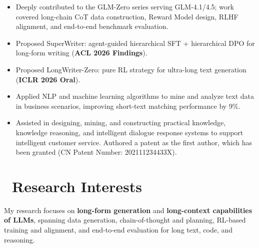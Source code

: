 \documentclass{resume}
\begin{document}
\begin{itemize}
    \item Deeply contributed to the GLM-Zero series serving GLM-4.1/4.5; work covered long-chain CoT data construction, Reward Model design, RLHF alignment, and end-to-end benchmark evaluation.
    \item Proposed SuperWriter: agent-guided hierarchical SFT + hierarchical DPO for long-form writing (\textbf{ACL 2026 Findings}).
    \item Proposed LongWriter-Zero: pure RL strategy for ultra-long text generation (\textbf{ICLR 2026 Oral}).
\end{itemize}

\begin{itemize}
    \item Applied NLP and machine learning algorithms to mine and analyze text data in business scenarios, improving short-text matching performance by 9\%.
    \item Assisted in designing, mining, and constructing practical knowledge, knowledge reasoning, and intelligent dialogue response systems to support intelligent customer service. Authored a patent as the first author, which has been granted (CN Patent Number: 202111234433X).
\end{itemize}

\section{\faInfo\ Research Interests}
My research focuses on \textbf{long-form generation} and \textbf{long-context capabilities of LLMs}, spanning data generation, chain-of-thought and planning, RL-based training and alignment, and end-to-end evaluation for long text, code, and reasoning.
\end{document}
